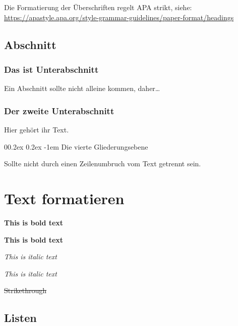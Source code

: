 \documentclass[
  doc]{apa7}
\makeatletter
\let\oldparagraph\paragraph
\renewcommand{\paragraph}[1]{\oldparagraph{#1}\mbox{}}
\renewcommand{\paragraph}{\@startsection{paragraph}{4}{\parindent}%
  {0\baselineskip \@plus 0.2ex \@minus 0.2ex}%
  {-1em}%
  {\normalfont\normalsize\bfseries\itshape\typesectitle}}
\renewcommand{\paragraph}{\@startsection{paragraph}{4}{\parindent}%
  {0\baselineskip \@plus 0.2ex \@minus 0.2ex}%
  {-1em}%
  {\normalfont\normalsize\bfseries\typesectitle}}
\makeatother
\begin{document}
Die Formatierung der Überschriften regelt APA strikt, siehe:
\url{https://apastyle.apa.org/style-grammar-guidelines/paper-format/headings}

\hypertarget{abschnitt}{%
\subsection{Abschnitt}\label{abschnitt}}

\hypertarget{das-ist-unterabschnitt}{%
\subsubsection{Das ist Unterabschnitt}\label{das-ist-unterabschnitt}}

Ein Abschnitt sollte nicht alleine kommen, daher\ldots{}

\hypertarget{der-zweite-unterabschnitt}{%
\subsubsection{Der zweite Unterabschnitt}\label{der-zweite-unterabschnitt}}

Hier gehört ihr Text.

\hypertarget{die-vierte-gliederungsebene}{%
\paragraph{Die vierte Gliederungsebene}\label{die-vierte-gliederungsebene}}

Sollte nicht durch einen Zeilenumbruch vom Text getrennt sein.

\hypertarget{text-formatieren}{%
\section{Text formatieren}\label{text-formatieren}}

\textbf{This is bold text}

\textbf{This is bold text}

\emph{This is italic text}

\emph{This is italic text}

\st{Strikethrough}

\hypertarget{listen}{%
\subsection{Listen}\label{listen}}
\end{document}

